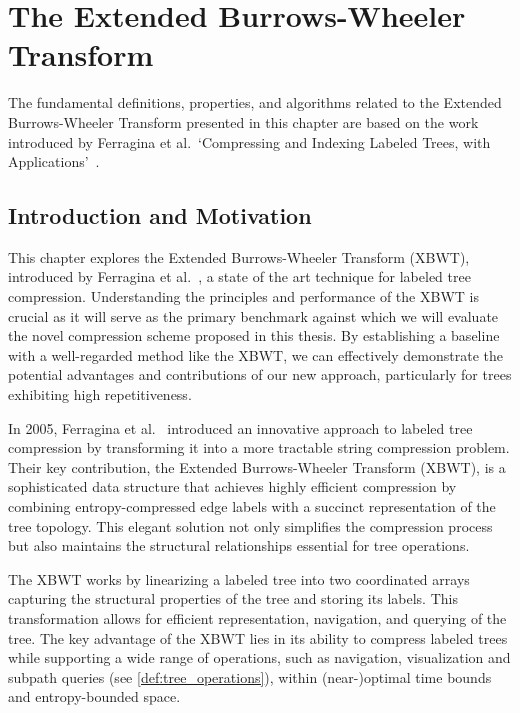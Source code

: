 \section[The Extended Burrows-Wheeler Transform]{The Extended Burrows-Wheeler \\ Transform} \label{chp:tree_compression}
The fundamental definitions, properties, and algorithms related to the Extended Burrows-Wheeler Transform presented in this chapter are based on the work introduced by Ferragina et al.~`Compressing and Indexing Labeled Trees, with Applications'~\cite{ferragina2009compressing}.

\subsection{Introduction and Motivation}
This chapter explores the Extended Burrows-Wheeler Transform (XBWT), introduced by Ferragina et al.~\cite{ferragina2009compressing}, a state of the art technique for labeled tree compression. Understanding the principles and performance of the XBWT is crucial as it will serve as the primary benchmark against which we will evaluate the novel compression scheme proposed in this thesis. By establishing a baseline with a well-regarded method like the XBWT, we can effectively demonstrate the potential advantages and contributions of our new approach, particularly for trees exhibiting high repetitiveness.

In 2005, Ferragina et al.~\cite{ferragina2009compressing} introduced an innovative approach to labeled tree compression by transforming it into a more tractable string compression problem. Their key contribution, the Extended Burrows-Wheeler Transform (XBWT), is a sophisticated data structure that achieves highly efficient compression by combining entropy-compressed edge labels with a succinct representation of the tree topology. This elegant solution not only simplifies the compression process but also maintains the structural relationships essential for tree operations.

The XBWT works by linearizing a labeled tree into two coordinated arrays capturing the structural properties of the tree and storing its labels. This transformation allows for efficient representation, navigation, and querying of the tree. The key advantage of the XBWT lies in its ability to compress labeled trees while supporting a wide range of operations, such as navigation, visualization and subpath queries (see \cref{def:tree_operations}), within (near-)optimal time bounds and entropy-bounded space.

